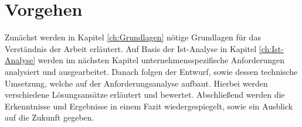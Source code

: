 \section{Vorgehen}


Zunächst werden in Kapitel \ref{ch:Grundlagen} nötige Grundlagen für das Verständnis der Arbeit erläutert. Auf Basis der Ist-Analyse in Kapitel \ref{ch:Ist-Analyse} werden im nächsten Kapitel unternehmensspezifische Anforderungen analysiert und ausgearbeitet. Danach folgen der Entwurf, sowie dessen technische Umsetzung, welche auf der Anforderungsanalyse aufbaut. Hierbei werden verschiedene Lösungsansätze erläutert und bewertet. Abschließend werden die Erkenntnisse und Ergebnisse in einem Fazit wiedergespiegelt, sowie ein Ausblick auf die Zukunft gegeben.